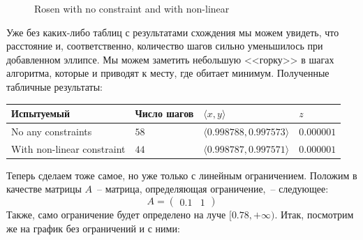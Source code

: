 \documentclass[12pt, a4paper, oneside, final]{article}
\begin{document}
\begin{figure}[H]
		\caption*{Rosen with no constraint and with non-linear}
	\end{figure}
	Уже без каких-либо таблиц с результатами схождения мы можем увидеть, что расстояние и, соответственно, количество шагов сильно уменьшилось при добавленном эллипсе.
	Мы можем заметить небольшую <<горку>> в шагах алгоритма, которые и приводят к месту, где обитает минимум.
	Полученные табличные результаты:
	\begin{table}[H]
		\centering
		\begin{tabular}{l|l|l|l}
			Испытуемый & Число шагов & $\langle x, y \rangle$ & $z$ \\ \hline
			No any constraints & $58$ & $\langle 0.998788, 0.997573 \rangle$ & $0.000001$ \\
			With non-linear constraint & $44$ & $\langle 0.998787, 0.997571 \rangle$ & $0.000001$
		\end{tabular}
	\end{table}
	Теперь сделаем тоже самое, но уже только с линейным ограничением.
	Положим в качестве матрицы $A$~-- матрица, определяющая ограничение,~-- следующее:
	\[
		A =
		\begin{pmatrix}
			0.1 & 1
		\end{pmatrix}
	\]
	Также, само ограничение будет определено на луче $[0.78, +\infty)$.
	Итак, посмотрим же на график без ограничений и с ними:
\end{document}
